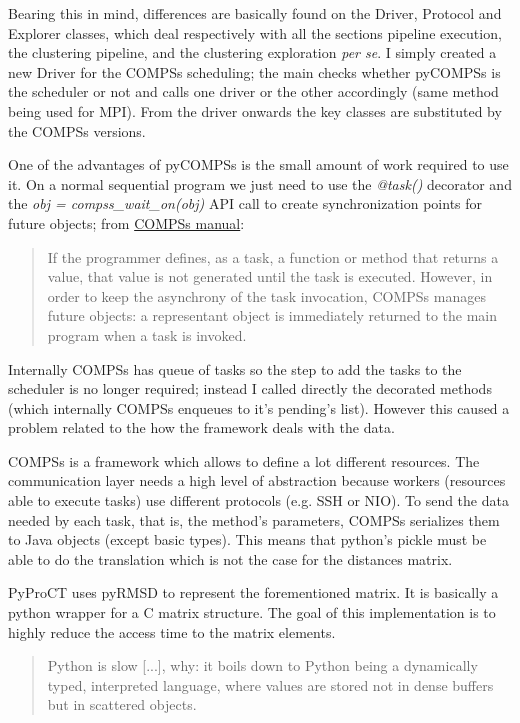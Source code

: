 Bearing this in mind, differences are basically found on the Driver, Protocol and Explorer classes, which deal respectively with all the sections pipeline execution, the clustering pipeline, and the clustering exploration \textit{per se}. I simply created a new Driver for the COMPSs scheduling; the main checks whether pyCOMPSs is the scheduler or not and calls one driver or the other accordingly (same method being used for MPI). From the driver onwards the key classes are substituted by the COMPSs versions.

One of the advantages of pyCOMPSs is the small amount of work required to use it. On a normal sequential program we just need to use the \textit{@task()} decorator and the \textit{obj = compss\_wait\_on(obj)} API call to create synchronization points for future objects; from \hyperref[sec:docs]{COMPSs manual}: 

\begin{quote} 
If the programmer defines, as a task, a function or method that returns a value, that value is not generated until the task is executed. However, in order to keep the asynchrony of the task invocation, COMPSs manages future objects: a representant object is immediately returned to the main program when a task is invoked.
\end{quote}

Internally COMPSs has queue of tasks so the step to add the tasks to the scheduler is no longer required; instead I called directly the decorated methods (which internally COMPSs enqueues to it's pending's list). However this caused a problem related to the how the framework deals with the data.

COMPSs is a framework which allows to define a lot different resources. The communication layer needs a high level of abstraction because workers (resources able to execute tasks) use different protocols (e.g. SSH or NIO). To send the data needed by each task, that is, the method's parameters, COMPSs serializes them to Java objects (except basic types). This means that python's pickle must be able to do the translation which is not the case for the distances matrix.

PyProCT uses pyRMSD to represent the forementioned matrix. It is basically a python wrapper for a C matrix structure. The goal of this implementation is to highly reduce the access time to the matrix elements. 
\begin{quote}
Python is slow [...], why: it boils down to Python being a dynamically typed, interpreted language, where values are stored not in dense buffers but in scattered objects. \cite{vanderplas_why_2014}
\end{quote}


